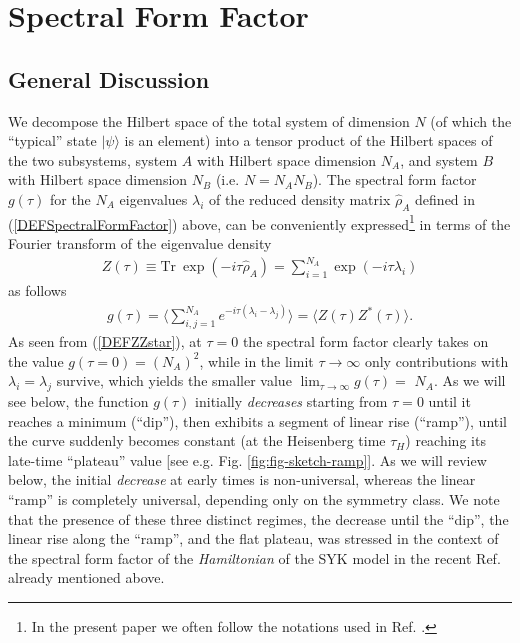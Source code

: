 \documentclass[aps,prb,preprint,onecolumn,amsmath,amssymb,superscriptaddress,eqsecnum,floatfix,scrartcl]{revtex4-1}
\begin{document}
\section{Spectral Form Factor}

\subsection{General Discussion}
\label{SubSectionSpectralFormFactorGeneralDiscussion}

We 
decompose the Hilbert space of the total system of dimension $N$
 (of which the ``typical'' state $|\psi\rangle$ is an element) into a tensor product of
the Hilbert spaces of the two subsystems, system $A$ with Hilbert space dimension $N_A$,
and system $B$ with Hilbert space dimension $N_B$ (i.e. $N=N_A N_B$).
The spectral form factor $g(\tau)$  for  the $N_A$  eigenvalues $\lambda_i$ of the reduced density matrix ${\hat  \rho}_A$
defined in
(\ref{DEFSpectralFormFactor}) above, can be conveniently expressed\footnote{In the present paper we often follow the notations used in Ref. .}
 in terms of the Fourier transform of the eigenvalue density
\begin{eqnarray}
\label{DEFFourierTransformEigenvalueDensity}
Z(\tau)\equiv \mbox{Tr} \ \exp(-i\tau {\hat \rho}_A)= \sum_{i=1}^{N_A} \exp(-i\tau
\lambda_i)
\end{eqnarray}
 as follows
\begin{eqnarray}
\label{DEFZZstar}
g(\tau) =  \langle\sum_{i,j=1}^{N_A} e^{-i \tau (\lambda_i-\lambda_j)}\rangle = \langle Z(\tau) Z^*(\tau)\rangle.
\end{eqnarray}
As seen from
(\ref{DEFZZstar}), at
 $\tau=0$ the spectral form factor clearly takes on the value 
$g(\tau=0)= (N_A)^2$, while in the limit $\tau\to \infty$ only contributions with $\lambda_i=\lambda_j$ survive, which yields the smaller
value
$\lim_{\tau\to\infty} g(\tau)=$ $N_A$.
As we will see below,  the function $g(\tau)$ initially {\it decreases} starting from $\tau=0$ until it reaches a minimum (``dip''), then exhibits
 a segment
of linear rise  (``ramp''), until the curve suddenly becomes constant (at the Heisenberg time $\tau_H$) reaching its late-time
``plateau'' value [see e.g.  
Fig. \ref{fig:fig-sketch-ramp}]. 
As we will review below, the initial {\it decrease} at early times is non-universal, whereas the  linear ``ramp'' is completely universal,
depending only  on the symmetry class.  We note that the presence of these  three distinct  regimes, 
the decrease until the ``dip'', the linear rise along the ``ramp'',
and the  flat plateau, was stressed in the context of the spectral form factor of the {\it  Hamiltonian} of the
SYK model  in the recent Ref.\  already mentioned above.
\end{document}
